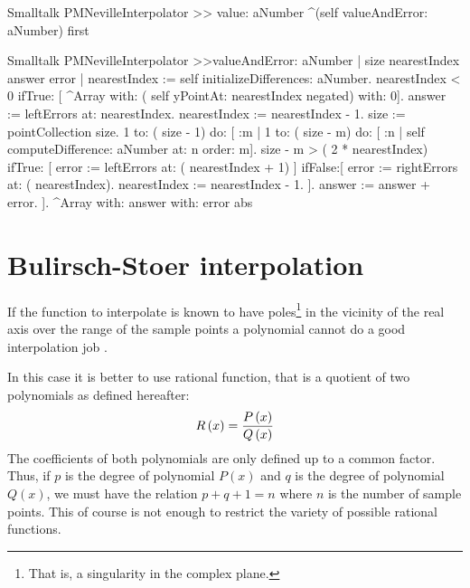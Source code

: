 \begin{displaycode}{Smalltalk}
PMNevilleInterpolator >> value: aNumber
    ^(self valueAndError: aNumber) first
\end{displaycode}

\begin{displaycode}{Smalltalk}
PMNevilleInterpolator >>valueAndError: aNumber
    | size nearestIndex answer error |
    nearestIndex := self initializeDifferences: aNumber.
    nearestIndex < 0
        ifTrue: [ ^Array with: ( self yPointAt: nearestIndex negated) 
                                                             with: 0].
    answer := leftErrors at: nearestIndex.
    nearestIndex := nearestIndex - 1.
    size := pointCollection size.
    1 to: ( size - 1) do:
        [ :m |
          1 to: ( size - m) do:
            [ :n | self computeDifference: aNumber at: n order: m].
          size - m > ( 2 * nearestIndex)
                ifTrue: [ error := leftErrors at: ( nearestIndex + 1) 
                                                                     ]
                ifFalse:[ error := rightErrors at: ( nearestIndex).
                              nearestIndex := nearestIndex - 1.
                            ].
          answer := answer + error.
        ].
    ^Array with: answer with: error abs

\end{displaycode}

\section{Bulirsch-Stoer interpolation}
If the function to interpolate is known to have
poles\footnote{That is, a singularity in the complex plane.} in
the vicinity of the real axis over the range of the sample points
a polynomial cannot do a good interpolation job \cite{Press}.

In this case it is better to use rational function, that is a
quotient of two polynomials as defined hereafter:
\begin{equation}
R\left(x\right)={P\left(x\right)\over Q\left(x\right)}
\end{equation}
The coefficients of both polynomials are only defined up to a
common factor. Thus, if $p$ is the degree of polynomial
$P\left(x\right)$ and $q$ is the degree of polynomial
$Q\left(x\right)$, we must have the relation $p+q+1 = n$ where $n$
is the number of sample points. This of course is not enough to
restrict the variety of possible rational functions.

